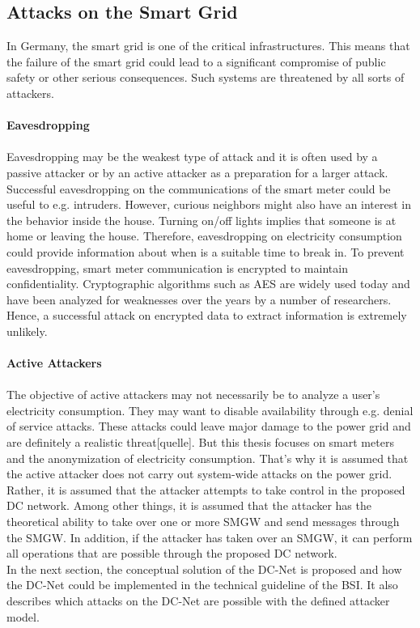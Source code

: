 \subsection{Attacks on the Smart Grid}
In Germany, the smart grid is one of the critical infrastructures. This means that the failure of the smart grid could lead to a significant compromise of public safety or other serious consequences. Such systems are threatened by all sorts of attackers. 
\\
\\
\textbf{Eavesdropping}
\\
\\
Eavesdropping may be the weakest type of attack and it is often used by a passive attacker or by an active attacker as a preparation for a larger attack. Successful eavesdropping on the communications of the smart meter could be useful to e.g. intruders. However, curious neighbors might also have an interest in the behavior inside the house. Turning on/off lights implies that someone is at home or leaving the house. Therefore, eavesdropping on electricity consumption could provide information about when is a suitable time to break in. To prevent eavesdropping, smart meter communication is encrypted to maintain confidentiality. Cryptographic algorithms such as AES are widely used today and have been analyzed for weaknesses over the years by a number of researchers. Hence, a successful attack on encrypted data to extract information is extremely unlikely.
\\
\\
\textbf{Active Attackers}
\\
\\
The objective of active attackers may not necessarily be to analyze a user's electricity consumption. They may want to disable availability through e.g. denial of service attacks. These attacks could leave major damage to the power grid and are definitely a realistic threat[quelle]. But this thesis focuses on smart meters and the anonymization of electricity consumption. That's why it is assumed that the active attacker does not carry out system-wide attacks on the power grid. Rather, it is assumed that the attacker attempts to take control in the proposed DC network. Among other things, it is assumed that the attacker has the theoretical ability to take over one or more SMGW and send messages through the SMGW. In addition, if the attacker has taken over an SMGW, it can perform all operations that are possible through the proposed DC network.\\In the next section, the conceptual solution of the DC-Net is proposed and how the DC-Net could be implemented in the technical guideline of the BSI. It also describes which attacks on the DC-Net are possible with the defined attacker model.

\clearpage


